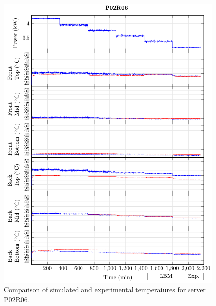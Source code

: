\documentclass[border=10pt,preview]{standalone}
\begin{document}
\begin{figure}[!htb]
\centering
\includegraphics[width=\linewidth]{Plots/P02R06_T.pdf}
\caption{Comparison of simulated and experimental temperatures for server P02R06.}
\label{fig:P02R06_plot}
\end{figure}

\clearpage
\end{document}
